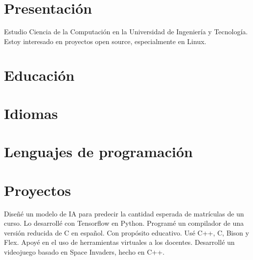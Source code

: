 \documentclass[10pt, a4paper]{moderncv}
\begin{document}
\maketitle
\section{Presentación}
Estudio Ciencia de la Computación en la Universidad de Ingeniería y Tecnología.
Estoy interesado en proyectos open source, especialmente en Linux.

\section{Educación}


\section{Idiomas}


\section{Lenguajes de programación}
\cvlistitem{\LaTeX}

\section{Proyectos}
{
	Diseñé un modelo de IA para predecir la cantidad esperada de matrículas de un curso.
	Lo desarrollé con Tensorflow en Python.
}
{
	Programé un compilador de una versión reducida de C en español.
	Con propósito educativo.
	Usé C++, C, Bison y Flex.
}
{
	Apoyé en el uso de herramientas virtuales a los docentes.
}
{
	Desarrollé un videojuego basado en Space Invaders, hecho en C++.
}
\end{document}
